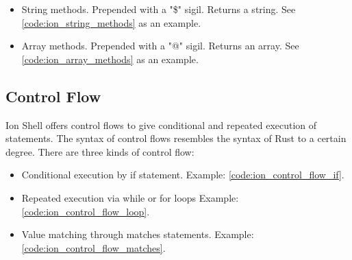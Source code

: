 \begin{itemize}
	\item String methods. Prepended with a "\$" sigil. Returns a string. See \ref{code:ion_string_methods} as an example.
	\item Array methods. Prepended with a "@" sigil. Returns an array. See \ref{code:ion_array_methods} as an example.
\end{itemize}


\clearpage

\subsection{Control Flow}\label{ion_shell_lang_control_flow}

Ion Shell offers control flows to give conditional and repeated execution of statements.
The syntax of control flows resembles the syntax of Rust to a certain degree.
There are three kinds of control flow:

\begin{itemize}
	\item Conditional execution by if statement. Example: \ref{code:ion_control_flow_if}.
	\item Repeated execution via while or for loops Example: \ref{code:ion_control_flow_loop}.
	\item Value matching through matches statements. Example: \ref{code:ion_control_flow_matches}.
\end{itemize}



